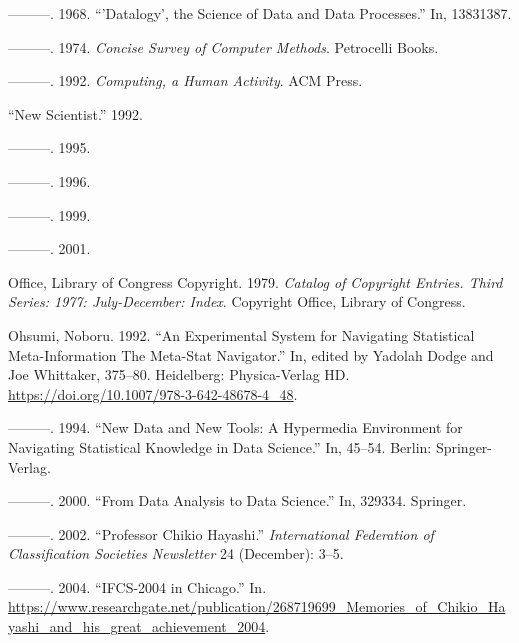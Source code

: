 \documentclass[
  letterpaper,
]{report}
\newlength{\cslhangindent}
\newlength{\cslentryspacingunit} %
\newenvironment{CSLReferences}[2] %
 {%
  \setlength{\parindent}{0pt}
  \ifodd #1
  \let\oldpar\par
  \def\par{\hangindent=\cslhangindent\oldpar}
  \fi
  \setlength{\parskip}{#2\cslentryspacingunit}
 }%
 {}
\begin{document}
\begin{CSLReferences}{1}{0}
\leavevmode{}%
---------. 1968. {``'Datalogy', the Science of Data and Data
Processes.''} In, 13831387.

\leavevmode{}%
---------. 1974. \emph{Concise Survey of Computer Methods}. Petrocelli
Books.

\leavevmode{}%
---------. 1992. \emph{Computing, a Human Activity}. ACM Press.

\leavevmode{}%
{``New Scientist.''} 1992.

\leavevmode{}%
---------. 1995.

\leavevmode{}%
---------. 1996.

\leavevmode{}%
---------. 1999.

\leavevmode{}%
---------. 2001.

\leavevmode{}%
Office, Library of Congress Copyright. 1979. \emph{Catalog of Copyright
Entries. Third Series: 1977: July-December: Index}. Copyright Office,
Library of Congress.

\leavevmode{}%
Ohsumi, Noboru. 1992. {``An Experimental System for Navigating
Statistical Meta-Information {\textemdash} The Meta-Stat Navigator.''}
In, edited by Yadolah Dodge and Joe Whittaker, 375--80. Heidelberg:
Physica-Verlag HD. \url{https://doi.org/10.1007/978-3-642-48678-4_48}.

\leavevmode{}%
---------. 1994. {``New Data and New Tools: A Hypermedia Environment for
Navigating Statistical Knowledge in Data Science.''} In, 45--54. Berlin:
Springer-Verlag.

\leavevmode{}%
---------. 2000. {``From Data Analysis to Data Science.''} In, 329334.
Springer.

\leavevmode{}%
---------. 2002. {``Professor Chikio Hayashi.''} \emph{International
Federation of Classification Societies Newsletter} 24 (December): 3--5.

\leavevmode{}%
---------. 2004. {``IFCS-2004 in Chicago.''} In.
\url{https://www.researchgate.net/publication/268719699_Memories_of_Chikio_Hayashi_and_his_great_achievement_2004}.


\end{CSLReferences}
\end{document}
